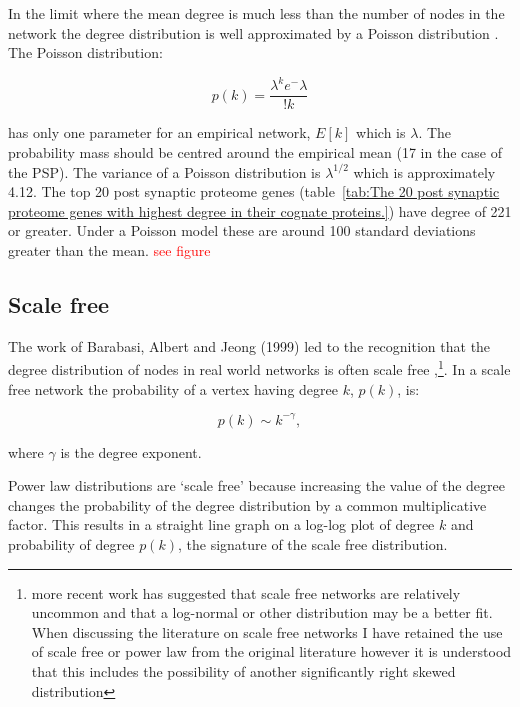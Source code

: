 In the limit where the mean degree is much less than the number of nodes in the network the degree distribution is well approximated by a Poisson distribution \cite{barabasi2016network}. The Poisson distribution:

\begin{equation}
    p(k) = \frac{\lambda^k e ^-\lambda}{!k}
\end{equation}

has only one parameter for an empirical network, $E[k]$ which is $\lambda$.  The probability mass should be centred around the empirical mean  (17 in the case of the PSP). The variance of a Poisson distribution is $\lambda^{1/2}$ which is approximately 4.12. The top 20 post synaptic proteome genes (table~\ref{tab:The 20 post synaptic proteome genes with highest degree in their cognate proteins.}) have degree of 221 or greater. Under a Poisson model these are around 100 standard deviations greater than the mean.   
 \textcolor{red}{see figure}


\subsection{Scale free}
\label{sec:scale_free}
The work of Barabasi, Albert and Jeong (1999) led to the recognition that the degree distribution of nodes in real world networks is often scale free \cite{barabasi1999emergence},\cite{barabasi1999mean}\footnote{more recent work has suggested that scale free networks are relatively uncommon and that a log-normal or other distribution may be a better fit. When discussing the literature on scale free networks I have retained the use of scale free or power law from the original literature however it is understood that this includes the possibility of another significantly right skewed distribution}. In a scale free network the probability of a vertex having degree $k$, $p(k)$, is:

\begin{equation}
    p(k) \sim k^{-\gamma},
\end{equation}
\label{eq:scale free}

where $\gamma$ is the degree exponent\cite{barabasi2016network}.

Power law distributions are `scale free' because increasing the value of the degree changes the probability of the degree distribution by a common multiplicative factor. This results in a straight line graph on a log-log plot of degree $k$ and probability of degree $p(k)$, the signature of the scale free distribution\cite{beltrami2013mathematical}. 

